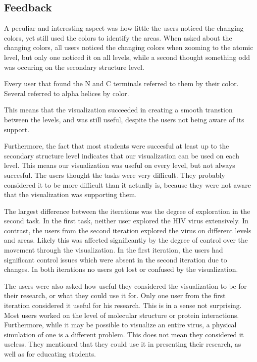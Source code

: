 \documentclass[review,journal]{vgtc}         %
\begin{document}
\subsection{Feedback}
A peculiar and interesting aspect was how little the users noticed the changing colors, yet still used the colors to identify the areas.
When asked about the changing colors, all users noticed the changing colors when zooming to the atomic level, but only one noticed it on all levels, while a second thought something odd was occuring on the secondary structure level. 
 
Every user that found the N and C terminals referred to them by their color. 
Several referred to alpha helices by color. 

This means that the visualization succeeded in creating a smooth transtion between the levels, and was still useful, despite the users not being aware of its support. 

Furthermore, the fact that most students were succesful at least up to the secondary structure level indicates that our visualization can be used on each level. 
This means our visualization was useful on every level, but not always succesful.
The users thought the tasks were very difficult.
They probably considered it to be more difficult than it actually is, because they were not aware that the visualization was supporting them.

The largest difference between the iterations was the degree of exploration in the second task. In the first task, neither user explored the HIV virus extensively. In contrast, the users from the second iteration explored the virus on different levels and areas. Likely this was affected significantly by the degree of control over the movement through the visualization. In the first iteration, the users had significant control issues which were absent in the second iteration due to changes. In both iterations no users got lost or confused by the visualization.

The users were also asked how useful they considered the visualization to be for their research, or what they could use it for. Only one user from the first iteration considered it useful for his research. This is in a sense not surprising. Most users worked on the level of molecular structure or protein interactions. Furthermore, while it may be possible to visualize an entire virus, a physical simulation of one is a different problem. This does not mean they considered it useless. They mentioned that they could use it in presenting their research, as well as for educating students.
\end{document}
